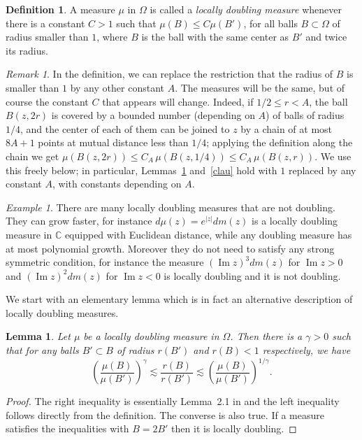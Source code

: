 \documentclass[12pt,twoside,final,psamsfonts]{amsart}
\theoremstyle{plain}
\newtheorem{lema}{Lemma}
\theoremstyle{remark}
\newtheorem*{remark}{Remark}
\newtheorem*{example}{Example}
\theoremstyle{definition}
\newtheorem*{defi}{Definition}
\newcommand{\C}{{\mathbb C}}
\renewcommand{\Im}{\operatorname{Im}}
\begin{document}
\begin{defi}
A measure $\mu$ in $\Omega$ is called a \emph{locally  doubling measure}
whenever there is a constant $C>1$  such that $\mu(B)\le C \mu(B')$, for all
balls $B\subset \Omega$ of radius smaller than $1$,  where $B$ is the ball
with the same center as $B'$ and twice its radius.  
\end{defi}

\begin{remark}
In the definition, we can replace the restriction that the radius of $B$ is
smaller than $1$ by any other constant $A$. The measures will be the same, but of
course the constant $C$ that appears will change. Indeed, if $1/2\le r<A$, the
ball $B(z,2r)$ is covered by a bounded number (depending on $A$) of balls of
radius $1/4$, and the center of each of them can be joined to $z$ by a chain
of at most $8A+1$ points at mutual distance less than $1/4$; applying the
definition along the chain we get $\mu(B(z,2r))\le C_A\,\mu(B(z,1/4))\le
C_A\,\mu(B(z,r))$. We use this freely below; in particular,
Lemmas~\ref{dis-mes} and~\ref{clau} hold with $1$ replaced by any constant
$A$, with constants depending on $A$.
\end{remark}

\begin{example}  
There are many locally doubling measures that are not doubling. They can grow
faster, for instance $d\mu(z)=e^{|z|}dm(z)$ is a locally doubling measure in
$\C$ equipped with Euclidean distance, while any doubling measure has at
most polynomial growth. Moreover they do not need to satisfy any strong 
symmetric
condition, for instance the measure $(\Im z)^3dm(z)$ for $\Im z>0$ and
$(\Im z)^2dm(z)$ for $\Im z<0$ is locally doubling and it is not doubling.
\end{example}

We start with an elementary lemma which is in fact an alternative 
description of locally doubling measures.

\begin{lema}\label{dis-mes}
Let $\mu$ be a locally
doubling measure in $\Omega$.  Then there is a $\gamma>0$
such that for any balls $B'\subset B$ of radius $r(B')$ and $r(B)<1$
respectively, we have
\[
\left(\frac{\mu(B)}{\mu(B')}\right)^{\gamma}\lesssim \frac {r(B)}{r(B')}
\lesssim \left(\frac{\mu(B)}{\mu(B')}\right)^{1/\gamma}.
\]
\end{lema}

\begin{proof}
The right inequality is essentially
Lemma~2.1 in \cite{Christ91} and the left inequality follows
directly from the definition. The converse is also true. If a measure
satisfies the inequalities with $B=2B'$ then it is locally doubling. 
\end{proof}
\end{document}
